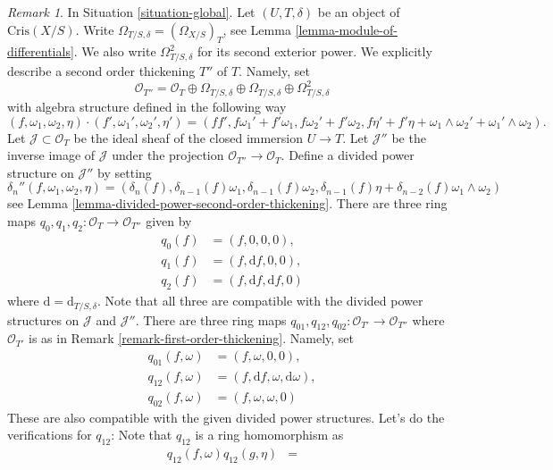 \documentclass{stacks-project}
\theoremstyle{plain}
\theoremstyle{definition}
\theoremstyle{remark}
\newtheorem{remark}[subsection]{Remark}
\numberwithin{equation}{subsection}
\begin{document}
\begin{remark}
\label{remark-second-order-thickening}
In Situation \ref{situation-global}.
Let $(U, T, \delta)$ be an object of $\text{Cris}(X/S)$.
Write $\Omega_{T/S, \delta} = (\Omega_{X/S})_T$, see
Lemma \ref{lemma-module-of-differentials}.
We also write $\Omega^2_{T/S, \delta}$ for its second exterior
power. We explicitly describe a second order thickening $T''$ of $T$.
Namely, set
$$
\mathcal{O}_{T''} =
\mathcal{O}_T \oplus \Omega_{T/S, \delta} \oplus \Omega_{T/S, \delta}
\oplus \Omega^2_{T/S, \delta}
$$
with algebra structure defined in the following way
$$
(f, \omega_1, \omega_2, \eta) \cdot
(f', \omega_1', \omega_2', \eta') =
(ff', f\omega_1' + f'\omega_1, f\omega_2' + f'\omega_2,
f\eta' + f'\eta + \omega_1 \wedge \omega_2' + \omega_1' \wedge \omega_2).
$$
Let $\mathcal{J} \subset \mathcal{O}_T$
be the ideal sheaf of the closed immersion $U \to T$. Let
$\mathcal{J}''$ be the inverse image of $\mathcal{J}$ under the
projection $\mathcal{O}_{T''} \to \mathcal{O}_T$.
Define a divided power structure on $\mathcal{J}''$ by setting
$$
\delta_n''(f, \omega_1, \omega_2, \eta) =
(\delta_n(f), \delta_{n - 1}(f)\omega_1, \delta_{n - 1}(f)\omega_2,
\delta_{n - 1}(f)\eta + \delta_{n - 2}(f)\omega_1 \wedge \omega_2)
$$
see Lemma \ref{lemma-divided-power-second-order-thickening}.
There are three ring maps
$q_0, q_1, q_2 : \mathcal{O}_T \to \mathcal{O}_{T''}$
given by
\begin{align*}
q_0(f) & = (f, 0, 0, 0), \\
q_1(f) & = (f, \text{d}f, 0, 0), \\
q_2(f) & = (f, \text{d}f, \text{d}f, 0)
\end{align*}
where $\text{d} = \text{d}_{T/S, \delta}$.
Note that all three are compatible with the divided power structures
on $\mathcal{J}$ and $\mathcal{J}''$. There are three ring maps
$q_{01}, q_{12}, q_{02} : \mathcal{O}_{T'} \to \mathcal{O}_{T''}$
where $\mathcal{O}_{T'}$ is as in Remark \ref{remark-first-order-thickening}.
Namely, set
\begin{align*}
q_{01}(f, \omega) & = (f, \omega, 0, 0), \\
q_{12}(f, \omega) & =
(f, \text{d}f, \omega, \text{d}\omega), \\
q_{02}(f, \omega) & = (f, \omega, \omega, 0)
\end{align*}
These are also compatible with the given divided power
structures. Let's do the verifications for $q_{12}$: Note
that $q_{12}$ is a ring homomorphism as
\begin{align*}
q_{12}(f, \omega)q_{12}(g, \eta) & =

\end{align*}
\end{remark}
\end{document}

